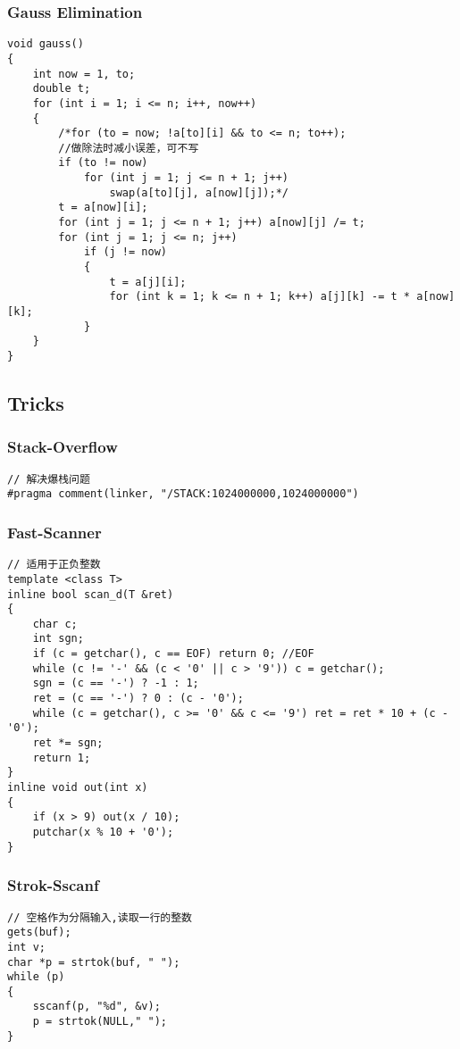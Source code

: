 \documentclass[twoside]{article}
\begin{document}
\subsubsection{Gauss Elimination}
\begin{lstlisting}
void gauss()
{
    int now = 1, to;
    double t;
    for (int i = 1; i <= n; i++, now++)
    {
        /*for (to = now; !a[to][i] && to <= n; to++);
        //做除法时减小误差，可不写
        if (to != now)
            for (int j = 1; j <= n + 1; j++)
                swap(a[to][j], a[now][j]);*/
        t = a[now][i];
        for (int j = 1; j <= n + 1; j++) a[now][j] /= t;
        for (int j = 1; j <= n; j++)
            if (j != now)
            {
                t = a[j][i];
                for (int k = 1; k <= n + 1; k++) a[j][k] -= t * a[now][k];
            }
    }
}
\end{lstlisting}
\subsection{Tricks}
\subsubsection{Stack-Overflow}
\begin{lstlisting}
// 解决爆栈问题
#pragma comment(linker, "/STACK:1024000000,1024000000")
\end{lstlisting}
\subsubsection{Fast-Scanner}
\begin{lstlisting}
// 适用于正负整数
template <class T>
inline bool scan_d(T &ret)
{
    char c;
    int sgn;
    if (c = getchar(), c == EOF) return 0; //EOF
    while (c != '-' && (c < '0' || c > '9')) c = getchar();
    sgn = (c == '-') ? -1 : 1;
    ret = (c == '-') ? 0 : (c - '0');
    while (c = getchar(), c >= '0' && c <= '9') ret = ret * 10 + (c - '0');
    ret *= sgn;
    return 1;
}
inline void out(int x)
{
    if (x > 9) out(x / 10);
    putchar(x % 10 + '0');
}
\end{lstlisting}
\subsubsection{Strok-Sscanf}
\begin{lstlisting}
// 空格作为分隔输入,读取一行的整数
gets(buf);
int v;
char *p = strtok(buf, " ");
while (p)
{
    sscanf(p, "%d", &v);
    p = strtok(NULL," ");
}
\end{lstlisting}
\end{document}

